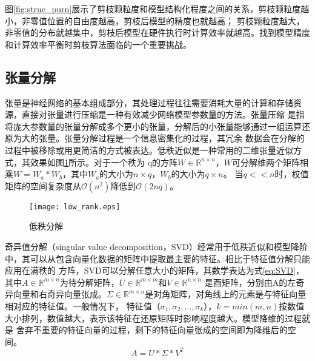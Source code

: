 图\ref{fig:struc_purn}展示了剪枝颗粒度和模型结构化程度之间的关系，剪枝颗粒度越小，非零值位置的自由度越高，剪枝后模型的精度也就越高；
剪枝颗粒度越大，非零值的分布就越集中，剪枝后模型在硬件执行时计算效率就越高。找到模型精度和计算效率平衡时剪枝算法面临的一个重要挑战。


\subsection{张量分解}
张量是神经网络的基本组成部分，其处理过程往往需要消耗大量的计算和存储资源，直接对张量进行压缩是一种有效减少网络模型参数量的方法。张量压缩
是指将庞大参数量的张量分解成多个更小的张量，分解后的小张量能够通过一组运算还原为大的张量。张量分解过程是一个信息密集化的过程，其冗余
数据会在分解的过程中被移除或用更简洁的方式被表达。低秩近似是一种常用的二维张量近似方式，其效果如图\ref{fig:lowrank}所示。对于一个秩为
q的方阵\(W \in \mathbb{R}^{n \times n}\)，\(W\)可分解维两个矩阵相乘\(W = W_a * W_b\)，其中\(W_a\)的大小为\(n \times q\)，\(W_b\)的大小为\(q \times n\)。
当\(q << n \)时，权值矩阵的空间复杂度从\(\mathcal{O}(n^2)\)降低到\(\mathcal{O}(2nq)\)。
\begin{figure}
	\centering
	\texttt{[image: low\_rank.eps]}
	\caption{低秩分解}
	\label{fig:lowrank}
\end{figure}

奇异值分解（singular value decomposition，SVD）经常用于低秩近似和模型降阶中，其可以从包含向量化数据的矩阵中提取最主要的特征。相比于特征值分解只能应用在满秩的
方阵，SVD可以分解任意大小的矩阵，其数学表达为式\ref{eq:SVD}，其中\(A \in \mathbb{R}^{m \times n}\)为待分解矩阵，\( U \in \mathbb{R}^{m \times m}\)和\( V \in \mathbb{R}^{n \times n}\)
是酉矩阵，分别由A的左奇异向量和右奇异向量张成。\(\Sigma \in \mathbb{R}^{m \times n}\)是对角矩阵，对角线上的元素是与特征向量相对应的特征值。一般情况下，
特征值（\(\sigma_1, \sigma_2,...,\sigma_k\)），\(k=min(m,n)\)按数值大小排列，数值越大，表示该特征在还原矩阵时影响程度越大。模型降维的过程就是
舍弃不重要的特征向量的过程，剩下的特征向量张成的空间即为降维后的空间。
\begin{equation}\label{eq:SVD}
	A = U* \Sigma * V^T
\end{equation}

